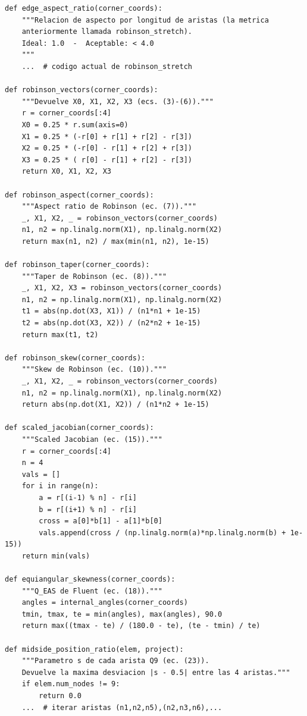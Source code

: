 \documentclass[11pt,a4paper]{article}
\begin{document}
\begin{lstlisting}[caption={Esqueleto propuesto para \texttt{fem/mesh\_quality.py}}]
def edge_aspect_ratio(corner_coords):
    """Relacion de aspecto por longitud de aristas (la metrica
    anteriormente llamada robinson_stretch).
    Ideal: 1.0  -  Aceptable: < 4.0
    """
    ...  # codigo actual de robinson_stretch

def robinson_vectors(corner_coords):
    """Devuelve X0, X1, X2, X3 (ecs. (3)-(6))."""
    r = corner_coords[:4]
    X0 = 0.25 * r.sum(axis=0)
    X1 = 0.25 * (-r[0] + r[1] + r[2] - r[3])
    X2 = 0.25 * (-r[0] - r[1] + r[2] + r[3])
    X3 = 0.25 * ( r[0] - r[1] + r[2] - r[3])
    return X0, X1, X2, X3

def robinson_aspect(corner_coords):
    """Aspect ratio de Robinson (ec. (7))."""
    _, X1, X2, _ = robinson_vectors(corner_coords)
    n1, n2 = np.linalg.norm(X1), np.linalg.norm(X2)
    return max(n1, n2) / max(min(n1, n2), 1e-15)

def robinson_taper(corner_coords):
    """Taper de Robinson (ec. (8))."""
    _, X1, X2, X3 = robinson_vectors(corner_coords)
    n1, n2 = np.linalg.norm(X1), np.linalg.norm(X2)
    t1 = abs(np.dot(X3, X1)) / (n1*n1 + 1e-15)
    t2 = abs(np.dot(X3, X2)) / (n2*n2 + 1e-15)
    return max(t1, t2)

def robinson_skew(corner_coords):
    """Skew de Robinson (ec. (10))."""
    _, X1, X2, _ = robinson_vectors(corner_coords)
    n1, n2 = np.linalg.norm(X1), np.linalg.norm(X2)
    return abs(np.dot(X1, X2)) / (n1*n2 + 1e-15)

def scaled_jacobian(corner_coords):
    """Scaled Jacobian (ec. (15))."""
    r = corner_coords[:4]
    n = 4
    vals = []
    for i in range(n):
        a = r[(i-1) % n] - r[i]
        b = r[(i+1) % n] - r[i]
        cross = a[0]*b[1] - a[1]*b[0]
        vals.append(cross / (np.linalg.norm(a)*np.linalg.norm(b) + 1e-15))
    return min(vals)

def equiangular_skewness(corner_coords):
    """Q_EAS de Fluent (ec. (18))."""
    angles = internal_angles(corner_coords)
    tmin, tmax, te = min(angles), max(angles), 90.0
    return max((tmax - te) / (180.0 - te), (te - tmin) / te)

def midside_position_ratio(elem, project):
    """Parametro s de cada arista Q9 (ec. (23)).
    Devuelve la maxima desviacion |s - 0.5| entre las 4 aristas."""
    if elem.num_nodes != 9:
        return 0.0
    ...  # iterar aristas (n1,n2,n5),(n2,n3,n6),...
\end{lstlisting}
\end{document}
